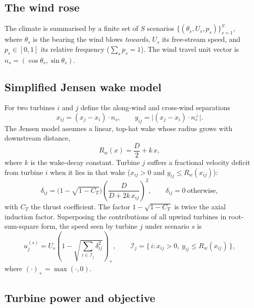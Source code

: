 \documentclass[11pt,a4paper]{article}
\begin{document}
\subsection{The wind rose}

The climate is summarised by a finite set of $S$ scenarios
$\{(\theta_{s}, U_{s}, p_{s})\}_{s=1}^{S}$, where $\theta_{s}$ is the bearing
the wind blows \emph{towards}, $U_{s}$ its free-stream speed, and
$p_{s}\in[0,1]$ its relative frequency ($\sum_{s} p_{s} = 1$). The wind travel
unit vector is $n_{s} = (\cos\theta_{s}, \sin\theta_{s})$.

\subsection{Simplified Jensen wake model}

For two turbines $i$ and $j$ define the along-wind and cross-wind separations
\begin{equation}
  x_{ij} = (x_{j}-x_{i})\cdot n_{s},
  \qquad
  y_{ij} = \bigl\lvert (x_{j}-x_{i})\cdot n_{s}^{\perp} \bigr\rvert .
\end{equation}
The Jensen model \cite{jensen1983} assumes a linear, top-hat wake whose radius
grows with downstream distance,
\begin{equation}
  R_{w}(x) = \frac{D}{2} + k\,x ,
  \label{eq:wake-radius}
\end{equation}
where $k$ is the wake-decay constant. Turbine $j$ suffers a fractional velocity
deficit from turbine $i$ when it lies in that wake ($x_{ij}>0$ and
$y_{ij}\le R_{w}(x_{ij})$):
\begin{equation}
  \delta_{ij}
  = \bigl(1-\sqrt{1-C_{T}}\bigr)
    \left(\frac{D}{D + 2k\,x_{ij}}\right)^{2},
  \qquad
  \delta_{ij}=0 \ \text{otherwise},
  \label{eq:deficit}
\end{equation}
with $C_{T}$ the thrust coefficient. The factor $1-\sqrt{1-C_{T}}$ is twice the
axial induction factor. Superposing the contributions of all upwind turbines in
root-sum-square form, the speed seen by turbine $j$ under scenario $s$ is
\begin{equation}
  u_{j}^{(s)} = U_{s}\left( 1-\sqrt{\sum_{i \in \mathcal{I}_{j}} \delta_{ij}^{2}} \right)_{+},
  \qquad
  \mathcal{I}_{j} = \{\, i : x_{ij}>0,\ y_{ij}\le R_{w}(x_{ij}) \,\},
  \label{eq:speed}
\end{equation}
where $(\cdot)_{+}=\max(\cdot,0)$.

\subsection{Turbine power and objective}
\end{document}
